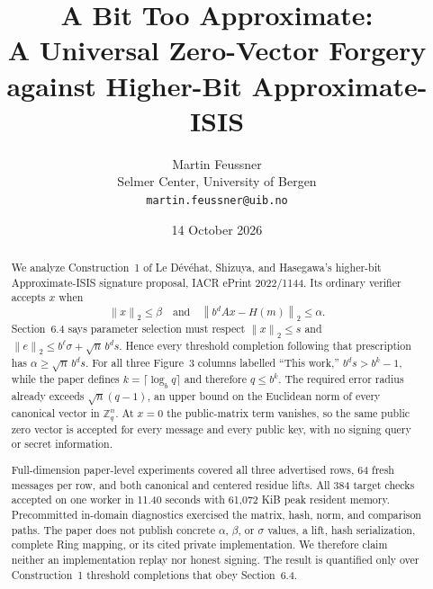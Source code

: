 \documentclass[10pt,a4paper]{article}
\title{\bfseries A Bit Too Approximate:\\
A Universal Zero-Vector Forgery against Higher-Bit Approximate-ISIS}
\author{Martin Feussner\\
\small Selmer Center, University of Bergen\\
\small \texttt{martin.feussner@uib.no}}
\date{14 October 2026}
\newcommand{\Z}{\mathbb{Z}}
\newcommand{\norm}[1]{\left\lVert #1\right\rVert_2}
\begin{document}
\maketitle

\noindent{}

\begin{abstract}
We analyze Construction~1 of Le Dévéhat, Shizuya, and Hasegawa's higher-bit
Approximate-ISIS signature proposal, IACR ePrint 2022/1144. Its ordinary
verifier accepts $x$ when
\[
  \norm{x}\leq\beta
  \quad\text{and}\quad
  \norm{b^dAx-H(m)}\leq\alpha.
\]
Section~6.4 says parameter selection must respect
$\norm{x}\leq s$ and
$\norm{e}\leq b^\ell\sigma+\sqrt n\,b^d s$. Hence every threshold completion
following that prescription has
$\alpha\geq\sqrt n\,b^d s$. For all three Figure~3 columns labelled
``This work,'' $b^d s>b^k-1$, while the paper defines
$k=\lceil\log_bq\rceil$ and therefore $q\leq b^k$. The required error radius
already exceeds $\sqrt n(q-1)$, an upper bound on the Euclidean norm of every
canonical vector in $\Z_q^n$. At $x=0$ the public-matrix term vanishes, so the
same public zero vector is accepted for every message and every public key,
with no signing query or secret information.

Full-dimension paper-level experiments covered all three advertised rows, 64
fresh messages per row, and both canonical and centered residue lifts. All
384 target checks accepted on one worker in 11.40 seconds with 61,072 KiB peak
resident memory. Precommitted in-domain diagnostics exercised the matrix,
hash, norm, and comparison paths. The paper does not publish concrete
$\alpha$, $\beta$, or $\sigma$ values, a lift, hash serialization, complete
Ring mapping, or its cited private implementation. We therefore claim neither
an implementation replay nor honest signing. The result is quantified only
over Construction~1 threshold completions that obey Section~6.4.
\end{abstract}
\end{document}
